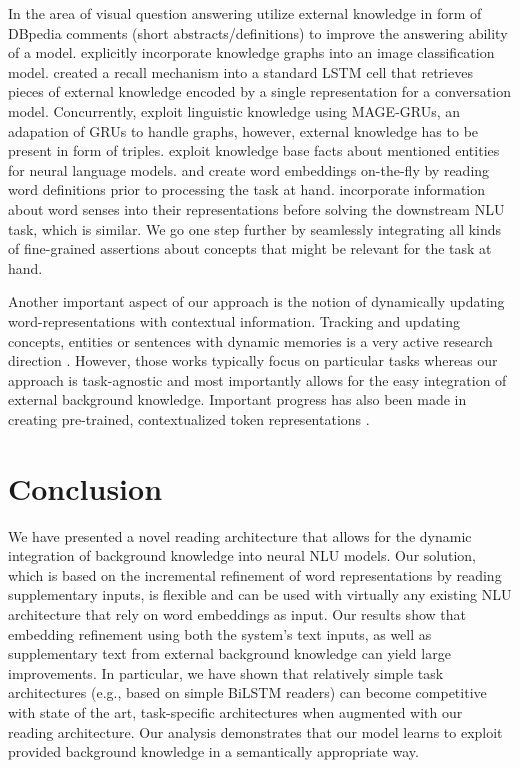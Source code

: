 \documentclass[11pt,a4paper]{article}
\begin{document}
In the area of visual question answering \citet{Wu2016} utilize external knowledge in form of DBpedia comments (short abstracts/definitions) to improve the answering ability of a model. \citet{marino2016more} explicitly incorporate knowledge graphs into an image classification model. \citet{Xu2016} created a recall mechanism into a standard LSTM cell that retrieves pieces of external knowledge encoded by a single representation for a conversation model. Concurrently, \citet{Dhingra2017} exploit linguistic knowledge using MAGE-GRUs, an adapation of GRUs to handle graphs, however, external knowledge has to be present in form of triples. \citet{ahn2016neural} exploit knowledge base facts about mentioned entities for neural language models. \citet{bahdanau2017learning} and  \citet{long2017world} create word embeddings on-the-fly by reading word definitions prior to processing the task at hand. \citet{pilehvar2017towards} incorporate information about word senses into their representations before solving the downstream NLU task, which is similar. We go one step further by seamlessly integrating all kinds of fine-grained assertions about concepts that might be relevant for the task at hand.

Another important aspect of our approach is the notion of dynamically updating word-representations with contextual information. Tracking and updating concepts, entities or sentences with dynamic memories is a very active research direction \citep{kumar2016ask,henaff2017tracking,ji2017dynamic,kobayashi2017neural}. However, those works typically focus on particular tasks whereas our approach is task-agnostic and most importantly allows for the easy integration of external background knowledge. Important progress has also been made in creating pre-trained, contextualized token representations \cite{Peters2017,mccann2017learned}.

\section{Conclusion}

We have presented a novel reading architecture that allows for the dynamic integration of background knowledge into neural NLU models. Our solution, which is based on the incremental refinement of word representations by reading supplementary inputs, is flexible and can be used with virtually any existing NLU architecture that rely on word embeddings as input.  Our results show that embedding refinement using both the system's text inputs, as well as supplementary text from external background knowledge can yield large improvements. In particular, we have shown that relatively simple task architectures (e.g., based on simple BiLSTM readers) can become competitive with state of the art, task-specific architectures when augmented with our reading architecture. Our analysis demonstrates that our model learns to exploit provided background knowledge in a semantically appropriate way.
\end{document}
